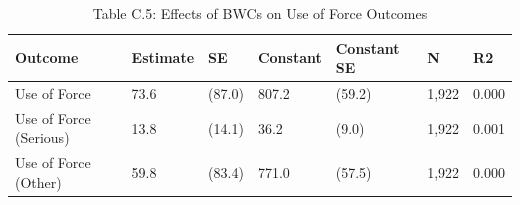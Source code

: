 \begin{table}

\caption{Table C.5: Effects of BWCs on Use of Force Outcomes}
\centering
\begin{tabular}[t]{lllllll}
\toprule
Outcome & Estimate & SE & Constant & Constant SE & N & R2\\
\midrule
Use of Force & 73.6 & (87.0) & 807.2 & (59.2) & 1,922 & 0.000\\
Use of Force (Serious) & 13.8 & (14.1) & 36.2 & (9.0) & 1,922 & 0.001\\
Use of Force (Other) & 59.8 & (83.4) & 771.0 & (57.5) & 1,922 & 0.000\\
\bottomrule
\end{tabular}
\end{table}
